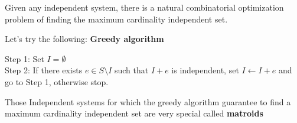 			Given any independent system, there is a natural combinatorial optimization problem of finding the maximum cardinality independent set. 

			Let's try the following: \textbf{Greedy algorithm}

			Step 1: Set $I=\emptyset$\\
			Step 2: If there exists $e\in S \setminus I$ such that $I + e$ is independent, set $I \leftarrow I+e$ and go to Step 1, otherwise stop.

			Those Independent systems for which the greedy algorithm guarantee to find a maximum cardinality independent set are very special called \textbf{matroids}

